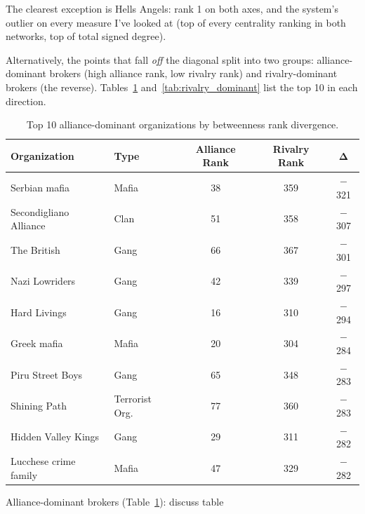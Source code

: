 \documentclass[11pt,a4paper]{article}
\begin{document}
The clearest exception is Hells Angels: rank 1 on both axes, and the system's outlier on every measure I've looked at (top of every centrality ranking in both networks, top of total signed degree).

Alternatively, the points that fall \emph{off} the diagonal split into two groups: alliance-dominant brokers (high alliance rank, low rivalry rank) and rivalry-dominant brokers (the reverse). Tables~\ref{tab:alliance_dominant} and~\ref{tab:rivalry_dominant} list the top 10 in each direction.

\begin{table}[H]
\centering
\caption{Top 10 alliance-dominant organizations by betweenness rank divergence.}
\label{tab:alliance_dominant}
\small
\begin{tabular}{@{}llccc@{}}
\toprule
\textbf{Organization} & \textbf{Type} & \textbf{Alliance Rank} & \textbf{Rivalry Rank} & $\boldsymbol{\Delta}$ \\
\midrule
Serbian mafia & Mafia & 38 & 359 & $-$321 \\
Secondigliano Alliance & Clan & 51 & 358 & $-$307 \\
The British & Gang & 66 & 367 & $-$301 \\
Nazi Lowriders & Gang & 42 & 339 & $-$297 \\
Hard Livings & Gang & 16 & 310 & $-$294 \\
Greek mafia & Mafia & 20 & 304 & $-$284 \\
Piru Street Boys & Gang & 65 & 348 & $-$283 \\
Shining Path & Terrorist Org. & 77 & 360 & $-$283 \\
Hidden Valley Kings & Gang & 29 & 311 & $-$282 \\
Lucchese crime family & Mafia & 47 & 329 & $-$282 \\
\bottomrule
\end{tabular}
\end{table}

Alliance-dominant brokers (Table~\ref{tab:alliance_dominant}): discuss table 
\end{document}
